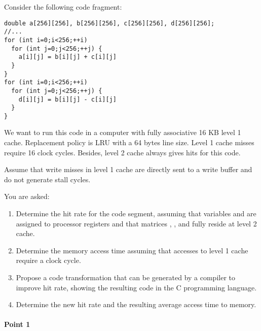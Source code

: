 \begin{acexercise}\end{acexercise}


Consider the following code fragment:

\begin{lstlisting}
double a[256][256], b[256][256], c[256][256], d[256][256];
//...
for (int i=0;i<256;++i)
  for (int j=0;j<256;++j) {
    a[i][j] = b[i][j] + c[i][j]
  }
}
for (int i=0;i<256;++i)
  for (int j=0;j<256;++j) {
    d[i][j] = b[i][j] - c[i][j]
  }
}
\end{lstlisting}

We want to run this code in a computer with fully associative 16 KB level 1
cache. Replacement policy is LRU with a 64 bytes line size. Level 1 cache misses
require 16 clock cycles. Besides, level 2 cache always gives hits for this code.

Assume that write misses in level 1 cache are directly sent to a write buffer
and do not generate stall cycles.

You are asked:

\begin{enumerate}
  \item Determine the hit rate for the code segment, assuming that variables
         and  are assigned to processor registers and that 
        matrices , ,  and  fully reside at
        level 2 cache.

  \item Determine the memory access time assuming that accesses to level 1 cache
        require a clock cycle.

  \item Propose a code transformation that can be generated by a compiler to
        improve hit rate, showing the resulting code in the C programming
        language.

  \item Determine the new hit rate and the resulting average access time to
        memory.

\end{enumerate}


\begin{acsolution}\end{acsolution}

\paragraph{Point 1}

